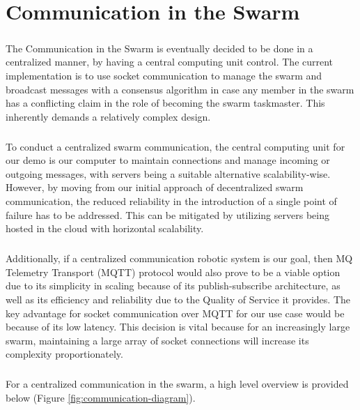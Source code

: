 \chapter{Communication in the Swarm}

\paragraph*{}
The Communication in the Swarm is eventually decided to be done in a centralized manner, by having a central computing unit control. The current implementation is to use socket communication to manage the swarm and broadcast messages with a consensus algorithm in case any member in the swarm has a conflicting claim in the role of becoming the swarm taskmaster. This inherently demands a relatively complex design.

\paragraph*{}
To conduct a centralized swarm communication, the central computing unit for our demo is our computer to maintain connections and manage incoming or outgoing messages, with servers being a suitable alternative scalability-wise. However, by moving from our initial approach of decentralized swarm communication, the reduced reliability in the introduction of a single point of failure has to be addressed. This can be mitigated by utilizing servers being hosted in the cloud with horizontal scalability.

\paragraph*{}
Additionally, if a centralized communication robotic system is our goal, then MQ Telemetry Transport (MQTT) protocol would also prove to be a viable option due to its simplicity in scaling because of its publish-subscribe architecture, as well as its efficiency and reliability due to the Quality of Service it provides. The key advantage for socket communication over MQTT for our use case would be because of its low latency. This decision is vital because for an increasingly large swarm, maintaining a large array of socket connections will increase its complexity proportionately.

\paragraph*{}
For a centralized communication in the swarm, a high level overview is provided below (Figure \ref{fig:communication-diagram}).

